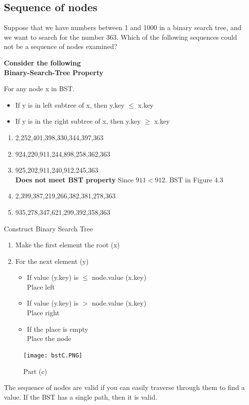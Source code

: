 \documentclass[11pt,fleqn]{book}
\begin{document}
\subsection{Sequence of nodes} 
\begin{example}
Suppose that we have numbers between 1 and 1000 in a binary search tree, and we want to search for the number 363. Which of the following  sequences could not be a sequence of nodes examined? 
\end{example}
\vspace{1em}
\textbf{Consider the following}\\
\textbf{Binary-Search-Tree Property} 
\begin{definition}
For any node x in BST. 
\begin{itemize}
    \item If y is in left subtree of x, then y.key $\leq$ x.key 
    \item If y is in the right subtree of x, then y.key $\geq $ x.key
\end{itemize}
\end{definition}
\begin{enumerate}[label=(\alph*)]
    \item 2,252,401,398,330,344,397,363
    \item 924,220,911,244,898,258,362,363
    \color{red}
    \item 925,202,911,240,912,245,363\\
    \textbf{Does not meet BST property } Since $911 < 912$. BST in Figure 4.3\color{black}
    \item 2,399,387,219,266,382,381,278,363
    \item 935,278,347,621,299,392,358,363
\end{enumerate}
\vspace{1em}
Construct Binary Search Tree
\begin{enumerate}
    \item Make the first element the root (x)
    \item For the next element (y) 
    \begin{itemize}
        \item If value (y.key) is $\leq$ node.value (x.key)\\ Place left
        \item If value (y.key) is $>$ node.value (x.key)\\
        Place right 
        \item If the place is empty \\ 
        Place the node 
    \end{itemize}
\end{enumerate}
\begin{figure}[h!]
    \centering
    \texttt{[image: bstC.PNG]}
    \caption{Part (c)}
    \label{fig:example_4_3}
\end{figure}
\begin{remark}
The sequence of nodes are valid if you can easily traverse through them to find a value. If the BST has a single path, then it is valid. 
\end{remark}
\end{document}
